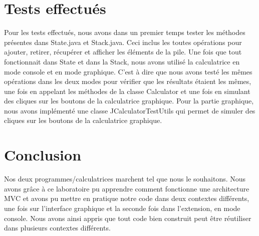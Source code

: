 \documentclass[12pt]{report}
\begin{document}
    \section*{Tests effectués}
    Pour les tests effectués, nous avons dans un premier temps tester les méthodes présentes dans State.java et Stack.java.
    Ceci inclus les toutes opérations pour ajouter, retirer, récupérer et afficher les éléments de la pile.
    \newline
    Une fois que tout fonctionnait dans State et dans la Stack, nous avons utilisé la calculatrice en mode console et en
    mode graphique. C'est à dire que nous avons testé les mêmes opérations dans les deux modes pour vérifier que les
    résultats étaient les mêmes, une fois en appelant les méthodes de la classe Calculator et une fois en simulant des
    cliques sur les boutons de la calculatrice graphique. Pour la partie graphique, nous avons implémenté une classe
    JCalculatorTestUtils qui permet de simuler des cliques sur les boutons de la calculatrice graphique.
    \newline


    \section*{Conclusion}
        Nos deux programmes/calculatrices marchent tel que nous le souhaitons. Nous avons grâce à ce laboratoire pu apprendre
    comment fonctionne une architecture MVC et avons pu mettre en pratique notre code dans deux contextes différents, une fois sur
    l'interface graphique et la seconde fois dans l'extension, en mode console. \newline Nous avons ainsi appris que tout code bien construit
    peut être réutiliser dans plusieurs contextes différents.
\end{document}
